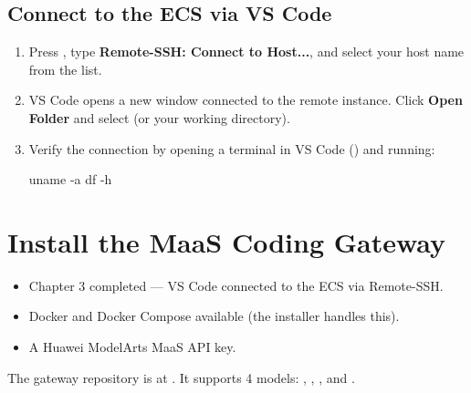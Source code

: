 \documentclass{guide}
\begin{document}
\subsection{Connect to the ECS via VS Code}

\stepbystep
\begin{enumerate}
  \item Press , type \textbf{Remote-SSH: Connect to Host...}, and
        select your host name from the list.

  \item VS Code opens a new window connected to the remote instance. Click
        \textbf{Open Folder} and select  (or your working
        directory).

  \item Verify the connection by opening a terminal in VS Code
        () and running:

  \begin{code}[bash]
uname -a
df -h
  \end{code}
\end{enumerate}

\section{Install the MaaS Coding Gateway}

\begin{objectives}

  \prerequisites
  \begin{itemize}
    \item Chapter 3 completed — VS Code connected to the ECS via Remote-SSH.
    \item Docker and Docker Compose available (the installer handles this).
    \item A Huawei ModelArts MaaS API key.
  \end{itemize}
\end{objectives}

\begin{infobox}
The gateway repository is at
.
It supports 4 models: , ,
, and .
\end{infobox}
\end{document}
